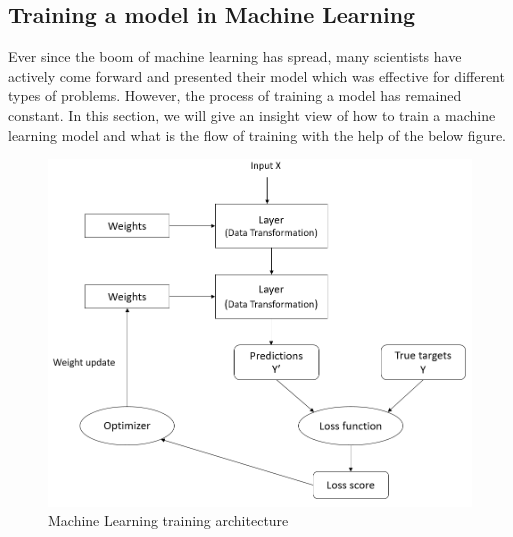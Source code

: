 \subsection{Training a model in Machine Learning}
Ever since the boom of machine learning has spread, many scientists have actively come forward and presented their model which was effective for different types of problems. However, the process of training a model has remained constant. In this section, we will give an insight view of how to train a machine learning model and what is the flow of training with the help of the below figure.
\begin{figure}[H]
\centering
\includegraphics[scale=0.7]{images/Chapter2/ml-training-arch.png}
\caption{Machine Learning training architecture}
\label{mlt-arch}
\end{figure}
\par
